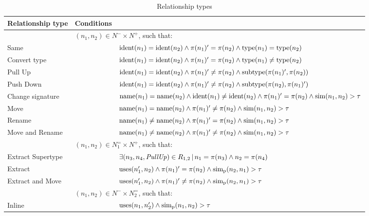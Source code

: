 \begin{table}[htbp]
\renewcommand{\arraystretch}{1.2}
\caption{Relationship types}
\label{TabRelationshipTypes}
\centering

\begin{tabular}{@{}lll@{}}
\toprule
Relationship type & Conditions \\
\midrule
& \multicolumn{2}{l}{$(n_1, n_2) \in N^- \times N^+$, such that:}\\
Same & & $\operatorname{ident}(n_1) = \operatorname{ident}(n_2) \land \operatorname{\pi}(n_1)' = \operatorname{\pi}(n_2) \land \operatorname{type}(n_1) = \operatorname{type}(n_2)$ \\
Convert type & & $\operatorname{ident}(n_1) = \operatorname{ident}(n_2) \land \operatorname{\pi}(n_1)' = \operatorname{\pi}(n_2) \land \operatorname{type}(n_1) \neq \operatorname{type}(n_2)$ \\
Pull Up & & $\operatorname{ident}(n_1) = \operatorname{ident}(n_2) \land \operatorname{\pi}(n_1)' \neq \operatorname{\pi}(n_2) \land \operatorname{subtype}(\operatorname{\pi}(n_1)', \operatorname{\pi}(n_2))$ \\
Push Down & & $\operatorname{ident}(n_1) = \operatorname{ident}(n_2) \land \operatorname{\pi}(n_1)' \neq \operatorname{\pi}(n_2) \land \operatorname{subtype}(\operatorname{\pi}(n_2), \operatorname{\pi}(n_1)')$ \\
Change signature & & $\operatorname{name}(n_1) = \operatorname{name}(n_2) \land \operatorname{ident}(n_1) \neq \operatorname{ident}(n_2) \land \operatorname{\pi}(n_1)' = \operatorname{\pi}(n_2) \land \operatorname{sim}(n_1, n_2) > \tau$ \\
Move & & $\operatorname{name}(n_1) = \operatorname{name}(n_2) \land \operatorname{\pi}(n_1)' \neq \operatorname{\pi}(n_2) \land \operatorname{sim}(n_1, n_2) > \tau$ \\
Rename & & $\operatorname{name}(n_1) \neq \operatorname{name}(n_2) \land \operatorname{\pi}(n_1)' = \operatorname{\pi}(n_2) \land \operatorname{sim}(n_1, n_2) > \tau$ \\
Move and Rename & & $\operatorname{name}(n_1) \neq \operatorname{name}(n_2) \land \operatorname{\pi}(n_1)' \neq \operatorname{\pi}(n_2) \land \operatorname{sim}(n_1, n_2) > \tau$ \\
\addlinespace
& \multicolumn{2}{l}{$(n_1, n_2) \in N_1^= \times N^+$, such that:}\\
Extract Supertype & & $\exists (n_3, n_4, \mathit{PullUp}) \in R_{1,2}\,|\,n_1 = \operatorname{\pi}(n_3) \land n_2 = \operatorname{\pi}(n_4)$ \\
Extract & & $\operatorname{uses}(n_1', n_2) \land \operatorname{\pi}(n_1)' = \operatorname{\pi}(n_2) \land \operatorname{sim_{p}}(n_2, n_1) > \tau$ \\
Extract and Move & & $\operatorname{uses}(n_1', n_2) \land \operatorname{\pi}(n_1)' \neq \operatorname{\pi}(n_2) \land \operatorname{sim_{p}}(n_2, n_1) > \tau$ \\
\addlinespace
& \multicolumn{2}{l}{$(n_1, n_2) \in N^- \times N_2^=$, such that:}\\
Inline & & $\operatorname{uses}(n_1, n_2') \land \operatorname{sim_{p}}(n_1, n_2) > \tau$ \\
\bottomrule
\end{tabular}


\end{table}
